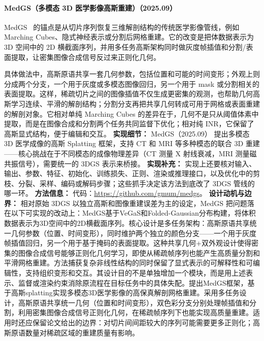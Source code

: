 \paragraph{MedGS（多模态 3D 医学影像高斯重建）（2025.09）}
MedGS~\cite{2509_16806} 的锚点是从切片序列恢复三维解剖结构的传统医学影像管线，例如 Marching Cubes、隐式神经表示或分割后网格重建。它的改变是把体数据表示为 3D 空间中的 2D 横截面序列，并用多任务高斯架构同时做灰度帧插值和分割/表面提取，让密集图像合成信号反过来正则化几何。

具体做法中，高斯原语共享一套几何参数，包括位置和可能的时间变形；外观上则分成两个分支，一个用于灰度或多模态图像回归，另一个用于 mask 或分割相关的表面提取。这样，稀疏切片之间的图像插值不仅生成更密集的观测，也帮助几何高斯学习连续、平滑的解剖结构；分割分支再把共享几何转成可用于网格或表面重建的解剖对象。它相对单纯 Marching Cubes 的差异在于，几何不是只从阈值体素中提取，而是在图像合成和分割两个任务共同监督下优化；相对纯 INR，它保留了高斯显式结构，便于编辑和交互。
\textbf{实现细节：} MedGS（2025.09） 提出多模态 3D 医学成像的高斯 Splatting 框架，支持 CT 和 MRI 等多种模态的联合 3D 重建——核心挑战在于不同模态的成像物理差异（CT 测量 X 射线衰减，MRI 测量磁共振信号），需要统一的 3DGS 表示来桥接。
\textbf{实现补充：} 实现上还要核对输入、输出、参数、特征、初始化、训练损失、正则、渲染或推理接口，以及优化中的剪枝、分裂、采样、编码或解码步骤；这些抓手决定该方法到底改了 3DGS 管线的哪一环。
\textbf{方法信息：} 代码：\url{https://github.com/gmum/medgs}。
\textbf{设计动机与边界：} 相对原始 3DGS 以独立高斯和图像重建误差为主的设定，MedGS 把问题落在以下可实现的改动上：MedGS基于VeGaS和Folded-Gaussian分布构建，将体积数据表示为3D空间中的2D横截面序列。核心设计是多任务架构：高斯原语共享统一几何参数（位置、时间变形），同时维护两个独立的颜色分支——一个用于灰度帧插值回归，另一个用于基于掩码的表面提取。这种共享几何+双外观设计使得密集的图像合成信号能够正则化几何学习，即使从稀疏帧序列也能产生高质量分割和平滑网格重建。方法捕获复杂非线性结构的同时保留了显式表示的可解释性和可编辑性，支持组织变形和交互。其设计目的不是单独增加一个模块，而是用上述表示、监督或渲染约束消除原流程在目标任务中的具体失配。提出MedGS框架，基于高斯splatting实现多模态3D医学影像的高保真解剖网格重建。采用多任务设计，高斯原语共享统一几何（位置和时间变形），双色彩分支分别处理帧插值和分割，利用密集图像合成信号正则化几何，在稀疏帧序列下也能实现高质量重建。适用时还应保留论文给出的边界：对切片间间距较大的序列可能需要更多正则化；高斯原语数量对稀疏区域的重建质量有影响。
